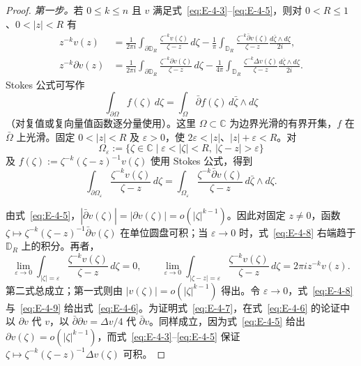 \begin{proof}
\emph{第一步。}若 $0\le k\le n$ 且 $v$ 满足式~\eqref{eq:E-4-3}--\eqref{eq:E-4-5}，则对 $0<R\le1$、$0<|z|<R$ 有
\begin{align}
z^{-k}v(z)
 &=\frac1{2\pi i}\int_{\partial\mathbb D_R}
    \frac{\zeta^{-k}v(\zeta)}{\zeta-z}\,d\zeta
   -\frac1\pi\int_{\mathbb D_R}
    \frac{\zeta^{-k}\bar\partial v(\zeta)}{\zeta-z}
    \frac{d\bar\zeta\wedge d\zeta}{2i},
    \label{eq:E-4-6}\\
z^{-k}\partial v(z)
 &=\frac1{2\pi i}\int_{\partial\mathbb D_R}
    \frac{\zeta^{-k}\partial v(\zeta)}{\zeta-z}\,d\zeta
   -\frac1{4\pi}\int_{\mathbb D_R}
    \frac{\zeta^{-k}\Delta v(\zeta)}{\zeta-z}
    \frac{d\bar\zeta\wedge d\zeta}{2i}.
    \label{eq:E-4-7}
\end{align}
Stokes 公式可写作
\[
  \int_{\partial\Omega}f(\zeta)\,d\zeta
  =\int_\Omega\bar\partial f(\zeta)\,d\bar\zeta\wedge d\zeta
\]
（对复值或复向量值函数逐分量使用）。这里 $\Omega\subset\mathbb C$ 为边界光滑的有界开集，$f$ 在 $\bar\Omega$ 上光滑。固定 $0<|z|<R$ 及 $\varepsilon>0$，使 $2\varepsilon<|z|$、$|z|+\varepsilon<R$。对
\[
  \Omega_\varepsilon:=\{\zeta\in\mathbb C\mid
  \varepsilon<|\zeta|<R,\ |\zeta-z|>\varepsilon\}
\]
及 $f(\zeta):=\zeta^{-k}(\zeta-z)^{-1}v(\zeta)$ 使用 Stokes 公式，得到
\begin{equation}\label{eq:E-4-8}
  \int_{\partial\Omega_\varepsilon}
    \frac{\zeta^{-k}v(\zeta)}{\zeta-z}\,d\zeta
  =\int_{\Omega_\varepsilon}
    \frac{\zeta^{-k}\bar\partial v(\zeta)}{\zeta-z}
    \,d\bar\zeta\wedge d\zeta.
\end{equation}

由式~\eqref{eq:E-4-5}，$|\bar\partial v(\zeta)|=|\partial v(\zeta)|=o(|\zeta|^{k-1})$。因此对固定 $z\ne0$，函数 $\zeta\mapsto\zeta^{-k}(\zeta-z)^{-1}\bar\partial v(\zeta)$ 在单位圆盘可积；当 $\varepsilon\to0$ 时，式~\eqref{eq:E-4-8} 右端趋于 $\mathbb D_R$ 上的积分。再者，
\begin{equation}\label{eq:E-4-9}
  \lim_{\varepsilon\to0}\int_{|\zeta|=\varepsilon}
    \frac{\zeta^{-k}v(\zeta)}{\zeta-z}\,d\zeta=0,
  \qquad
  \lim_{\varepsilon\to0}\int_{|\zeta-z|=\varepsilon}
    \frac{\zeta^{-k}v(\zeta)}{\zeta-z}\,d\zeta
    =2\pi i z^{-k}v(z).
\end{equation}
第二式总成立；第一式则由 $|v(\zeta)|=o(|\zeta|^{k-1})$ 得出。令 $\varepsilon\to0$，式~\eqref{eq:E-4-8} 与~\eqref{eq:E-4-9} 给出式~\eqref{eq:E-4-6}。为证明式~\eqref{eq:E-4-7}，在式~\eqref{eq:E-4-6} 的论证中以 $\partial v$ 代 $v$，以 $\bar\partial\partial v=\Delta v/4$ 代 $\bar\partial v$。同样成立，因为式~\eqref{eq:E-4-5} 给出 $\partial v(\zeta)=o(|\zeta|^{k-1})$，而式~\eqref{eq:E-4-3}--\eqref{eq:E-4-5} 保证 $\zeta\mapsto\zeta^{-k}(\zeta-z)^{-1}\Delta v(\zeta)$ 可积。


\end{proof}
